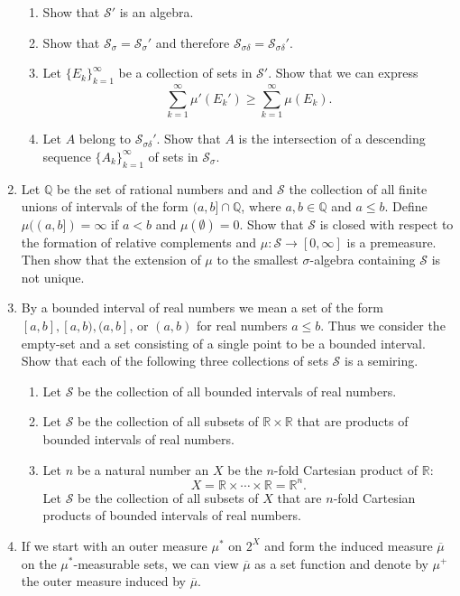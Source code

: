 \begin{enumerate}
	\begin{enumerate}[label=(\roman*),align=left]  
		\item Show that $\mathcal{S}'$ is an algebra.
		\item Show that $\mathcal{S}_\sigma=\mathcal{S}_\sigma'$ and therefore $\mathcal{S}_{\sigma\delta}=\mathcal{S}_{\sigma\delta}'$.
		\item Let $\{E_k\}_{k=1}^\infty$ be a collection of sets in $\mathcal{S}'$. Show that we can express 
		\[
			\sum_{k=1}^\infty \mu'(E_k')\ge\sum_{k=1}^\infty \mu(E_k).
		\]
		\item Let $A$ belong to $\mathcal{S}_{\sigma\delta}'$. Show that $A$ is the intersection of a descending sequence $\{A_k\}_{k=1}^\infty$ of sets in $\mathcal{S}_\sigma$.
	\end{enumerate}
	\item Let $\mathbb{Q}$ be the set of rational numbers and and $\mathcal{S}$ the collection of all finite unions of intervals of the form $(a,b]\cap\mathbb{Q}$, where $a,b\in\mathbb{Q}$ and $a\le b$. 
	Define $\mu((a,b])=\infty$ if $a<b$ and $\mu(\emptyset)=0$.
	Show that $\mathcal{S}$ is closed with respect to the formation of relative complements and $\mu:\mathcal{S}\to[0,\infty]$ is a premeasure.
	Then show that the extension of $\mu$ to the smallest $\sigma$-algebra containing $\mathcal{S}$ is not unique.
	\item By a bounded interval of real numbers we mean a set of the form $[a,b],[a,b),(a,b]$, or $(a,b)$ for real numbers $a\le b$.
	Thus we consider the empty-set and a set consisting of a single point to be a bounded interval.
	Show that each of the following three collections of sets $\mathcal{S}$ is a semiring.
	\begin{enumerate}[label=(\roman*),align=left]  
		\item Let $\mathcal{S}$ be the collection of all bounded intervals of real numbers.
		\item Let $\mathcal{S}$ be the collection of all subsets of $\mathbb{R}\times\mathbb{R}$ that are products of bounded intervals of real numbers.
		\item Let $n$ be a natural number an $X$ be the $n$-fold Cartesian product of $\mathbb{R}$:
		\[
			X=\mathbb{R}\times\cdots\times\mathbb{R}=\mathbb{R}^n.
		\]
		Let $\mathcal{S}$ be the collection of all subsets of $X$ that are $n$-fold Cartesian products of bounded intervals of real numbers.
	\end{enumerate}
	\item If we start with an outer measure $\mu^*$ on $2^X$ and form the induced measure $\overline\mu$ on the $\mu^*$-measurable sets, we can view $\overline\mu$ as a set function and denote by $\mu^+$ the outer measure induced by $\overline\mu$.

\end{enumerate}
